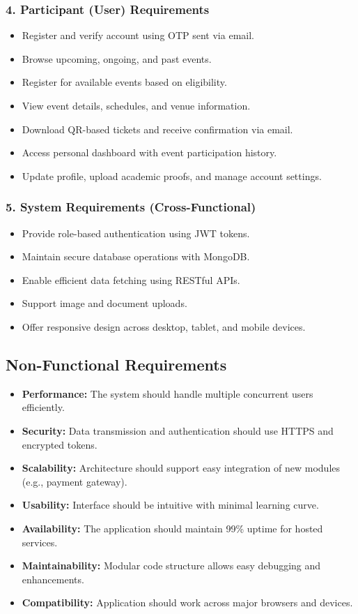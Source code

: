 \documentclass[12pt,a4paper]{report}
\begin{document}
\subsubsection*{4. Participant (User) Requirements}
\begin{itemize}
    \item Register and verify account using OTP sent via email.
    \item Browse upcoming, ongoing, and past events.
    \item Register for available events based on eligibility.
    \item View event details, schedules, and venue information.
    \item Download QR-based tickets and receive confirmation via email.
    \item Access personal dashboard with event participation history.
    \item Update profile, upload academic proofs, and manage account settings.
\end{itemize}

\subsubsection*{5. System Requirements (Cross-Functional)}
\begin{itemize}
    \item Provide role-based authentication using JWT tokens.
    \item Maintain secure database operations with MongoDB.
    \item Enable efficient data fetching using RESTful APIs.
    \item Support image and document uploads.
    \item Offer responsive design across desktop, tablet, and mobile devices.
\end{itemize}

\subsection{Non-Functional Requirements}

\begin{itemize}
    \item \textbf{Performance:} The system should handle multiple concurrent users efficiently.
    \item \textbf{Security:} Data transmission and authentication should use HTTPS and encrypted tokens.
    \item \textbf{Scalability:} Architecture should support easy integration of new modules (e.g., payment gateway).
    \item \textbf{Usability:} Interface should be intuitive with minimal learning curve.
    \item \textbf{Availability:} The application should maintain 99\% uptime for hosted services.
    \item \textbf{Maintainability:} Modular code structure allows easy debugging and enhancements.
    \item \textbf{Compatibility:} Application should work across major browsers and devices.
\end{itemize}
\end{document}

